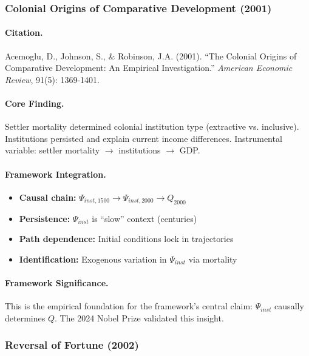 \subsubsection{Colonial Origins of Comparative Development (2001)}

\paragraph{Citation.}
Acemoglu, D., Johnson, S., \& Robinson, J.A. (2001).
``The Colonial Origins of Comparative Development: An Empirical Investigation.''
\emph{American Economic Review}, 91(5): 1369-1401.

\paragraph{Core Finding.}
Settler mortality determined colonial institution type (extractive vs. inclusive).
Institutions persisted and explain current income differences.
Instrumental variable: settler mortality $\to$ institutions $\to$ GDP.

\paragraph{Framework Integration.}
\begin{itemize}
  \item \textbf{Causal chain:} $\Psi_{inst,1500} \to \Psi_{inst,2000} \to Q_{2000}$
  \item \textbf{Persistence:} $\Psi_{inst}$ is ``slow'' context (centuries)
  \item \textbf{Path dependence:} Initial conditions lock in trajectories
  \item \textbf{Identification:} Exogenous variation in $\Psi_{inst}$ via mortality
\end{itemize}

\paragraph{Framework Significance.}
This is the empirical foundation for the framework's central claim:
$\Psi_{inst}$ causally determines $Q$. The 2024 Nobel Prize validated this insight.

\subsubsection{Reversal of Fortune (2002)}

